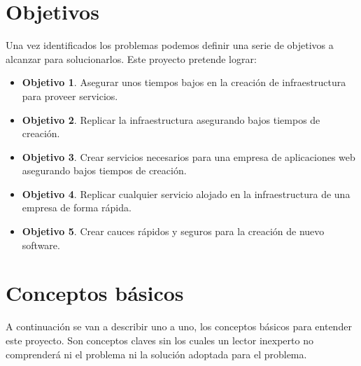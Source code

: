 \section{Objetivos}
\label{objetivos_primarios}
\begin{text}
	Una vez identificados los problemas podemos definir una serie de objetivos a alcanzar para solucionarlos. Este proyecto pretende lograr:
	\begin{itemize}
		\item \textbf{Objetivo 1}. Asegurar unos tiempos bajos en la creación de infraestructura para proveer servicios.
		\item \textbf{Objetivo 2}. Replicar la infraestructura asegurando bajos tiempos de creación.
		\item \textbf{Objetivo 3}. Crear servicios necesarios para una empresa de aplicaciones web asegurando bajos tiempos de creación.
		\item \textbf{Objetivo 4}. Replicar cualquier servicio alojado en la infraestructura de una empresa de forma rápida.
		\item \textbf{Objetivo 5}. Crear cauces rápidos y seguros para la creación de nuevo software.
	\end{itemize}
\end{text}

\section{Conceptos básicos}
		\begin{text}
			A continuación se van a describir uno a uno, los conceptos básicos para entender este proyecto. Son conceptos claves sin los cuales un lector inexperto no comprenderá ni el problema ni la solución adoptada para el problema.
		\end{text}
